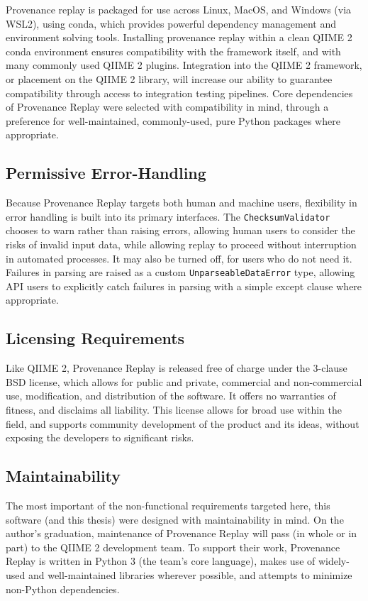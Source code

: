 Provenance replay is packaged for use across Linux, MacOS, and Windows (via
WSL2), using conda, which provides powerful dependency management and environment
solving tools. Installing provenance replay within a clean QIIME 2 conda
environment ensures compatibility with the framework itself, and with many
commonly used QIIME 2 plugins. Integration into the QIIME 2 framework, or
placement on the QIIME 2 library, will increase our ability to guarantee
compatibility through access to integration testing pipelines. Core dependencies
of Provenance Replay were selected with compatibility in mind, through a
preference for well-maintained, commonly-used, pure Python packages where
appropriate.

\subsection{Permissive Error-Handling}

Because Provenance Replay targets both human and machine users, flexibility in
error handling is built into its primary interfaces. The \texttt{ChecksumValidator}
chooses to warn rather than raising errors, allowing human users to consider the
risks of invalid input data, while allowing replay to proceed without
interruption in automated processes. It may also be turned off, for users who do
not need it. Failures in parsing are raised as a custom \texttt{UnparseableDataError}
type, allowing API users to explicitly catch failures in parsing with a simple
except clause where appropriate.

\subsection{Licensing Requirements}

Like QIIME 2, Provenance Replay is released free of charge under the 3-clause
BSD license, which allows for public and private, commercial and non-commercial
use, modification, and distribution of the software. It offers no warranties of
fitness, and disclaims all liability. This license allows for broad use within
the field, and supports community development of the product and its ideas,
without exposing the developers to significant risks.

\subsection{Maintainability}

The most important of the non-functional requirements targeted here, this
software (and this thesis) were designed with maintainability in mind. On the
author’s graduation, maintenance of Provenance Replay will pass (in whole or in
part) to the QIIME 2 development team. To support their work, Provenance Replay
is written in Python 3 (the team’s core language), makes use of widely-used and
well-maintained libraries wherever possible, and attempts to minimize non-Python
dependencies. 

